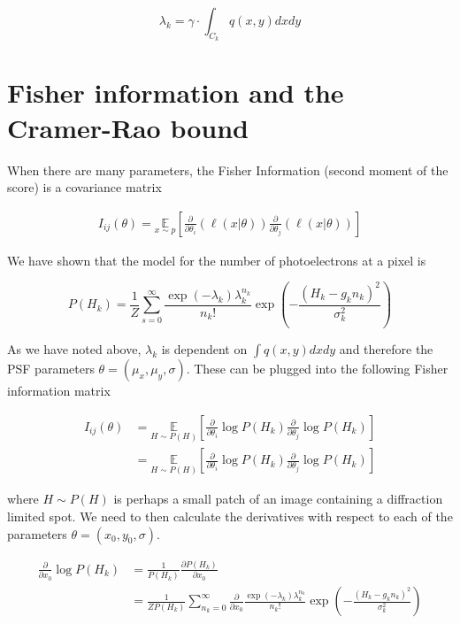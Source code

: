 \documentclass{article}
\begin{document}
\begin{equation*}
\lambda_{k} = \gamma\cdot\int_{C_{k}} q(x,y)dxdy
\end{equation*}

\section{Fisher information and the Cramer-Rao bound}

When there are many parameters, the Fisher Information (second moment of the score) is a covariance matrix

\begin{align*}
I_{ij}(\theta) = \underset{{x\sim p}}{\mathbb{E}}\left[\frac{\partial}{\partial\theta_{i}} \left(\ell(x|\theta)\right)\frac{\partial}{\partial\theta_{j}} \left(\ell(x|\theta)\right)\right]
\end{align*}

We have shown that the model for the number of photoelectrons at a pixel is

\begin{equation*}
P(H_{k}) = \frac{1}{Z}\sum_{s=0}^{\infty}\frac{\exp\left({-\lambda_{k}}\right)\lambda_{k}^{n_{k}}}{n_{k}!}\exp\left(-\frac{(H_{k}-g_{k}n_{k})^{2}}{\sigma_{k}^{2}}\right)
\end{equation*}

As we have noted above, $\lambda_{k}$ is dependent on $\int q(x,y)dxdy$ and therefore the PSF parameters $\theta = (\mu_{x},\mu_{y},\sigma)$. These can be plugged into the following Fisher information matrix

\begin{align*}
I_{ij}(\theta) &= \underset{{H\sim P(H)}}{\mathbb{E}}\left[\frac{\partial}{\partial\theta_{i}} \log P(H_{k})\frac{\partial}{\partial\theta_{j}} \log P(H_{k})\right]\\
&= \underset{{H\sim P(H)}}{\mathbb{E}}\left[\frac{\partial}{\partial\theta_{i}} \log P(H_{k})\frac{\partial}{\partial\theta_{j}}\log P(H_{k})\right]
\end{align*}

where $H\sim P(H)$ is perhaps a small patch of an image containing a diffraction limited spot. We need to then calculate the derivatives with respect to each of the parameters $\theta = (x_{0},y_{0},\sigma)$. 

\begin{align*}
\frac{\partial}{\partial x_{0}}\log P(H_{k}) &= \frac{1}{P(H_{k})} \frac{\partial P(H_{k})}{\partial x_{0}}\\
&=  \frac{1}{ZP(H_{k})}\sum_{n_{k}=0}^{\infty}\frac{\partial}{\partial x_{0}}\frac{\exp\left({-\lambda_{k}}\right)\lambda_{k}^{n_{k}}}{n_{k}!}\exp\left(-\frac{(H_{k}-g_{k}n_{k})^{2}}{\sigma_{k}^{2}}\right)\\
\end{align*}
\end{document}

